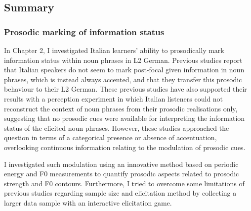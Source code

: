 \subsection{Summary}
\hypertarget{Toc191305961}{}\subsubsection{Prosodic marking of information status}
\hypertarget{Toc191305962}{}\begin{stylecaption}
\textup{In Chapter 2, I investigated Italian learners’ ability to prosodically mark information status within noun phrases in L2 German. Previous studies report that Italian speakers do not seem to mark post-focal given information in noun phrases, which is instead always accented, and that they transfer this prosodic behaviour to their L2 German. These previous studies have also supported their results with a perception experiment in which Italian listeners could not reconstruct the context of noun phrases from their prosodic realisations only, suggesting that no prosodic cues were available for interpreting the information status of the elicited noun phrases. However, these studies approached the question in terms of a categorical presence or absence of accentuation, overlooking continuous information relating to the modulation of prosodic cues. }
\end{stylecaption}

\begin{stylecaption}
\textup{I investigated such modulation using an innovative method based on periodic energy and F0 measurements to quantify prosodic aspects related to prosodic strength and F0 contours. Furthermore, I tried to overcome some limitations of previous studies regarding sample size and elicitation method by collecting a larger data sample with an interactive elicitation game.}
\end{stylecaption}


